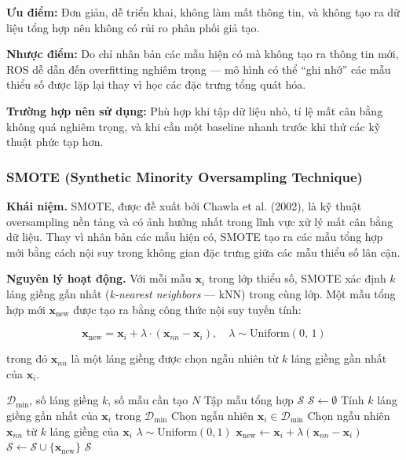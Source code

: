 \textbf{Ưu điểm:} Đơn giản, dễ triển khai, không làm mất thông tin, và không tạo ra dữ liệu tổng hợp nên không có rủi ro phân phối giả tạo.

\textbf{Nhược điểm:} Do chỉ nhân bản các mẫu hiện có mà không tạo ra thông tin mới, ROS dễ dẫn đến overfitting nghiêm trọng --- mô hình có thể ``ghi nhớ'' các mẫu thiểu số được lặp lại thay vì học các đặc trưng tổng quát hóa.

\textbf{Trường hợp nên sử dụng:} Phù hợp khi tập dữ liệu nhỏ, tỉ lệ mất cân bằng không quá nghiêm trọng, và khi cần một baseline nhanh trước khi thử các kỹ thuật phức tạp hơn.

\subsubsection{SMOTE (Synthetic Minority Oversampling Technique)}

\textbf{Khái niệm.}
SMOTE, được đề xuất bởi Chawla et al. (2002), là kỹ thuật oversampling nền tảng và có ảnh hưởng nhất trong lĩnh vực xử lý mất cân bằng dữ liệu. Thay vì nhân bản các mẫu hiện có, SMOTE tạo ra các mẫu tổng hợp mới bằng cách nội suy trong không gian đặc trưng giữa các mẫu thiểu số lân cận.

\textbf{Nguyên lý hoạt động.}
Với mỗi mẫu $\mathbf{x}_i$ trong lớp thiểu số, SMOTE xác định $k$ láng giềng gần nhất (\textit{k-nearest neighbors} --- kNN) trong cùng lớp. Một mẫu tổng hợp mới $\mathbf{x}_{\text{new}}$ được tạo ra bằng công thức nội suy tuyến tính:

\begin{equation}
  \mathbf{x}_{\text{new}}
  = \mathbf{x}_i + \lambda \cdot (\mathbf{x}_{nn} - \mathbf{x}_i),
  \quad \lambda \sim \mathrm{Uniform}(0,\,1)
  \label{eq:smote}
\end{equation}

\noindent trong đó $\mathbf{x}_{nn}$ là một láng giềng được chọn ngẫu nhiên từ $k$ láng giềng gần nhất của $\mathbf{x}_i$.

\begin{algorithm}[H]
\caption{SMOTE}
\begin{algorithmic}[1]
  \Require $\mathcal{D}_{\min}$, số láng giềng $k$, số mẫu cần tạo $N$
  \Ensure Tập mẫu tổng hợp $\mathcal{S}$
  \State $\mathcal{S} \leftarrow \emptyset$
    \State Tính $k$ láng giềng gần nhất của $\mathbf{x}_i$ trong $\mathcal{D}_{\min}$
  \EndFor
    \State Chọn ngẫu nhiên $\mathbf{x}_i \in \mathcal{D}_{\min}$
    \State Chọn ngẫu nhiên $\mathbf{x}_{nn}$ từ $k$ láng giềng của $\mathbf{x}_i$
    \State $\lambda \sim \mathrm{Uniform}(0, 1)$
    \State $\mathbf{x}_{\text{new}} \leftarrow \mathbf{x}_i + \lambda(\mathbf{x}_{nn} - \mathbf{x}_i)$
    \State $\mathcal{S} \leftarrow \mathcal{S} \cup \{\mathbf{x}_{\text{new}}\}$
  \EndFor
  \State \Return $\mathcal{S}$
\end{algorithmic}
\end{algorithm}


